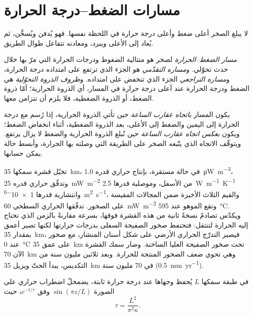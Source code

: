\section{مسارات الضغط--درجة الحرارة}\label{sec:b2:pt-paths:paths}

لا يبلغ الصخر أعلى ضغط وأعلى درجة حرارة في اللحظة نفسها.
فهو يُدفن ويُسخَّن، ثم يُعاد إلى الأعلى ويبرد، ومعادنه تتفاعل طوال
الطريق.

\begin{definition}\label{def:b2:pt-paths:paths}
\emph{مسار الضغط--الحرارة} لصخر هو متتالية الضغوط
ودرجات الحرارة التي مرّ بها خلال حدث تحوّلي. و\emph{مساره
التقدّمي} هو الجزء الذي ترتفع على امتداده درجة الحرارة، و\emph{مساره
التراجعي} الجزء الذي تنخفض على امتداده. و\emph{ظروف الذروة
التحوّلية} هي الضغط ودرجة الحرارة عند
أعلى درجة حرارة في المسار، أي الذروة الحرارية؛ أمّا ذروة الضغط، أو الذروة الضغطية، فلا يلزم
أن تتزامن معها.
\end{definition}

يكون المسار \emph{باتجاه عقارب الساعة} حين تأتي الذروة الحرارية، إذا رُسم مع درجة الحرارة إلى اليمين والضغط إلى الأعلى،
بعد الذروة الضغطية، أثناء انخفاض الضغط؛ ويكون
\emph{بعكس اتجاه عقارب الساعة} حين تُبلغ الذروة الحرارية والضغط لا يزال يرتفع.
ويتوقّف الاتجاه الذي يتّبعه الصخر على الطريقة التي وصلته بها الحرارة، وأبسط حالة يمكن
حسابها.

تخيّل قشرة سمكها \qty{35}{km}، في حالة مستقرة، بإنتاج حراري قدره
\qty{1.0}{\micro W.m^{-3}}، وتدفّق حراري قدره \qty{25}{mW.m^{-2}} من الأسفل، وموصلية
قدرها \qty{2.5}{W.m^{-1}.K^{-1}} وانتشارية قدرها \qty{1e-6}{m^2.s^{-1}}، والقيم الثلاث الأخيرة
ضمن المجالات المقيسة على الصخور. تدفّقها الحراري السطحي \qty{60}{mW.m^{-2}} وتقع الموهو عند
\qty{595}{\celsius}. ويكدّس تصادمٌ نسخةً ثانية من هذه القشرة فوقها، بسرعة
مقارنةً بالزمن الذي تحتاج إليه الحرارة لتنتقل: فتحتفظ صخور الصفيحة السفلى بدرجات
حرارتها لكنها تصير أعمق بمقدار \qty{35}{km}، فيصير التدرّج الحراري الأرضي على شكل أسنان المنشار، مع
صخور عند \qty{0}{\celsius} على عمق \qty{35}{km} تحت صخور الصفيحة العليا الساخنة. وصار سمك القشرة
الآن \qty{70}{km} وهي تحوي ضعف الصخور المنتجة للحرارة. وبعد ثلاثين مليون سنة من
التكديس، يبدأ الحتّ ويزيل \qty{35}{km} في 70 مليون سنة
(\qty{0.5}{mm.yr^{-1}}).

\begin{proposition}\label{prop:b2:pt-paths:relaxation}
في طبقة سمكها $L$ يُحفظ وجهاها عند درجة حرارة ثابتة، يضمحلّ اضطراب حراري
على الصورة $\sin(\pi z/L)$ وفق $e^{-t/\tau}$، حيث
\[
\tau = \frac{L^2}{\pi^2\kappa}.
\]
\end{proposition}


